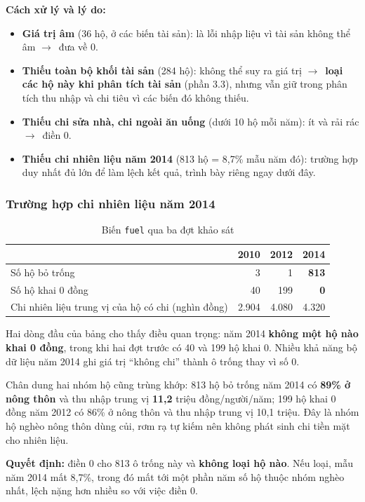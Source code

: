 \documentclass[11pt,a4paper]{article}
\newcommand{\ra}{$\rightarrow$}
\newcommand{\n}[1]{\textbf{#1}}
\begin{document}
\textbf{Cách xử lý và lý do:}

\begin{itemize}[leftmargin=1.3em,itemsep=4pt,topsep=2pt]
\item \n{Giá trị âm} (36 hộ, ở các biến tài sản): là lỗi nhập liệu vì tài sản không thể âm \ra\ đưa về 0.
\item \n{Thiếu toàn bộ khối tài sản} (284 hộ): không thể suy ra giá trị \ra\ \n{loại các hộ này khi phân tích tài sản} (phần 3.3), nhưng vẫn giữ trong phân tích thu nhập và chi tiêu vì các biến đó không thiếu.
\item \n{Thiếu chi sửa nhà, chi ngoài ăn uống} (dưới 10 hộ mỗi năm): ít và rải rác \ra\ điền 0.
\item \n{Thiếu chi nhiên liệu năm 2014} (813 hộ = 8,7\% mẫu năm đó): trường hợp duy nhất đủ lớn để làm lệch kết quả, trình bày riêng ngay dưới đây.
\end{itemize}

\subsubsection{Trường hợp chi nhiên liệu năm 2014}\label{sec:fuel}

\begin{table}[H]\centering\small
\caption{Biến \texttt{fuel} qua ba đợt khảo sát}
\begin{tabular}{lrrr}
\toprule
& 2010 & 2012 & 2014\\
\midrule
Số hộ bỏ trống & 3 & 1 & \textbf{813}\\
Số hộ khai 0 đồng & 40 & 199 & \textbf{0}\\
Chi nhiên liệu trung vị của hộ có chi (nghìn đồng) & 2.904 & 4.080 & 4.320\\
\bottomrule
\end{tabular}
\end{table}

Hai dòng đầu của bảng cho thấy điều quan trọng: năm 2014 \n{không một hộ nào khai 0 đồng}, trong khi hai đợt trước có 40 và 199 hộ khai 0. Nhiều khả năng bộ dữ liệu năm 2014 ghi giá trị “không chi” thành ô trống thay vì số 0.

Chân dung hai nhóm hộ cũng trùng khớp: 813 hộ bỏ trống năm 2014 có \n{89\% ở nông thôn} và thu nhập trung vị \n{11,2} triệu đồng/người/năm; 199 hộ khai 0 đồng năm 2012 có 86\% ở nông thôn và thu nhập trung vị 10,1 triệu. Đây là nhóm hộ nghèo nông thôn dùng củi, rơm rạ tự kiếm nên không phát sinh chi tiền mặt cho nhiên liệu.

\textbf{Quyết định:} điền 0 cho 813 ô trống này và \n{không loại hộ nào}. Nếu loại, mẫu năm 2014 mất 8,7\%, trong đó mất tới một phần năm số hộ thuộc nhóm nghèo nhất, lệch nặng hơn nhiều so với việc điền 0.
\end{document}
